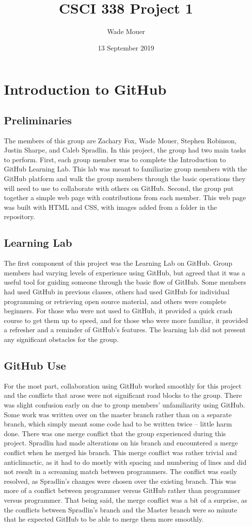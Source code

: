 \documentclass{article}
\title{CSCI 338 Project 1}
\author{Wade Mouer}
\date{13 September 2019}
\begin{document}
\section*{Introduction to GitHub}
\subsection*{Preliminaries}
The members of this group are Zachary Fox, Wade Mouer, Stephen Robinson, Justin Sharpe, and Caleb Spradlin. In this project, the group had two main tasks to perform. First, each group member was to complete the Introduction to GitHub Learning Lab. This lab was meant to familiarize group members with the GitHub platform and walk the group members through the basic operations they will need to use to collaborate with others on GitHub. Second, the group put together a simple web page with contributions from each member. This web page was built with HTML and CSS, with images added from a folder in the repository. 
\subsection*{Learning Lab}
The first component of this project was the Learning Lab on GitHub. Group members had varying levels of experience using GitHub, but agreed that it was a useful tool for guiding someone through the basic flow of GitHub. Some members had used GitHub in previous classes, others had used GitHub for individual programming or retrieving open source material, and others were complete beginners. For those who were not used to GitHub, it provided a quick crash course to get them up to speed, and for those who were more familiar, it provided a refresher and a reminder of GitHub's features. The learning lab did not present any significant obstacles for the group. 
\subsection*{GitHub Use}
For the most part, collaboration using GitHub worked smoothly for this project and the conflicts that arose were not significant road blocks to the group. There was slight confusion early on due to group members' unfamiliarity using GitHub. Some work was written over on the master branch rather than on a separate branch, which simply meant some code had to be written twice -- little harm done. There was one merge conflict that the group experienced during this project. Spradlin had made alterations on his branch and encountered a merge conflict when he merged his branch. This merge conflict was rather trivial and anticlimactic, as it had to do mostly with spacing and numbering of lines and did not result in a screaming match between programmers. The conflict was easily resolved, as Spradlin's changes were chosen over the existing branch. This was more of a conflict between programmer versus GitHub rather than programmer versus programmer. That being said, the merge conflict was a bit of a surprise, as the conflicts between Spradlin's branch and the Master branch were so minute that he expected GitHub to be able to merge them more smoothly. 
\end{document}
